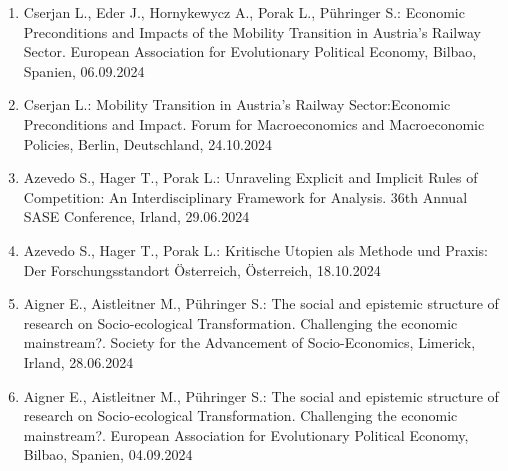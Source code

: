 \begin{enumerate}
	\item Cserjan L., Eder J., Hornykewycz A., Porak L., Pühringer S.: Economic Preconditions and Impacts of the Mobility Transition in Austria's Railway Sector. European Association for Evolutionary Political Economy, Bilbao, Spanien, 06.09.2024
	\item Cserjan L.: Mobility Transition in Austria’s Railway Sector:Economic Preconditions and Impact. Forum for Macroeconomics and Macroeconomic Policies, Berlin, Deutschland, 24.10.2024
	\item Azevedo S., Hager T., Porak L.: Unraveling Explicit and Implicit Rules of Competition: An Interdisciplinary Framework for Analysis. 36th Annual SASE Conference, Irland, 29.06.2024
	\item Azevedo S., Hager T., Porak L.: Kritische Utopien als Methode und Praxis: Der Forschungsstandort Österreich, Österreich, 18.10.2024
	\item Aigner E., Aistleitner M., Pühringer S.: The social and epistemic structure of research on Socio-ecological Transformation. Challenging the economic mainstream?. Society for the Advancement of Socio-Economics, Limerick, Irland, 28.06.2024
	\item Aigner E., Aistleitner M., Pühringer S.: The social and epistemic structure of research on Socio-ecological Transformation. Challenging the economic mainstream?. European Association for Evolutionary Political Economy, Bilbao, Spanien, 04.09.2024
\end{enumerate}
